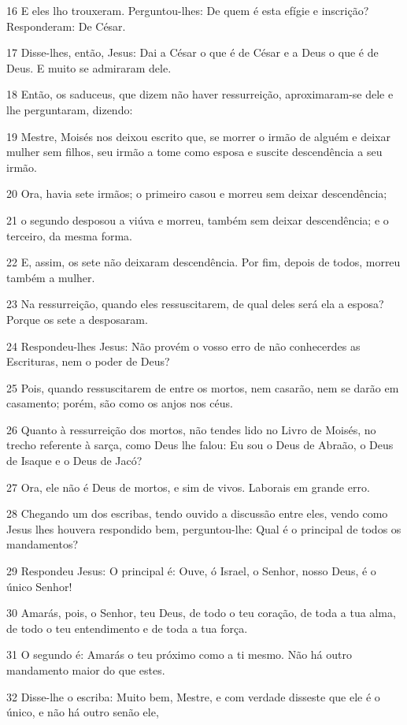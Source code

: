 \par 16 E eles lho trouxeram. Perguntou-lhes: De quem é esta efígie e inscrição? Responderam: De César.
\par 17 Disse-lhes, então, Jesus: Dai a César o que é de César e a Deus o que é de Deus. E muito se admiraram dele.
\par 18 Então, os saduceus, que dizem não haver ressurreição, aproximaram-se dele e lhe perguntaram, dizendo:
\par 19 Mestre, Moisés nos deixou escrito que, se morrer o irmão de alguém e deixar mulher sem filhos, seu irmão a tome como esposa e suscite descendência a seu irmão.
\par 20 Ora, havia sete irmãos; o primeiro casou e morreu sem deixar descendência;
\par 21 o segundo desposou a viúva e morreu, também sem deixar descendência; e o terceiro, da mesma forma.
\par 22 E, assim, os sete não deixaram descendência. Por fim, depois de todos, morreu também a mulher.
\par 23 Na ressurreição, quando eles ressuscitarem, de qual deles será ela a esposa? Porque os sete a desposaram.
\par 24 Respondeu-lhes Jesus: Não provém o vosso erro de não conhecerdes as Escrituras, nem o poder de Deus?
\par 25 Pois, quando ressuscitarem de entre os mortos, nem casarão, nem se darão em casamento; porém, são como os anjos nos céus.
\par 26 Quanto à ressurreição dos mortos, não tendes lido no Livro de Moisés, no trecho referente à sarça, como Deus lhe falou: Eu sou o Deus de Abraão, o Deus de Isaque e o Deus de Jacó?
\par 27 Ora, ele não é Deus de mortos, e sim de vivos. Laborais em grande erro.
\par 28 Chegando um dos escribas, tendo ouvido a discussão entre eles, vendo como Jesus lhes houvera respondido bem, perguntou-lhe: Qual é o principal de todos os mandamentos?
\par 29 Respondeu Jesus: O principal é: Ouve, ó Israel, o Senhor, nosso Deus, é o único Senhor!
\par 30 Amarás, pois, o Senhor, teu Deus, de todo o teu coração, de toda a tua alma, de todo o teu entendimento e de toda a tua força.
\par 31 O segundo é: Amarás o teu próximo como a ti mesmo. Não há outro mandamento maior do que estes.
\par 32 Disse-lhe o escriba: Muito bem, Mestre, e com verdade disseste que ele é o único, e não há outro senão ele,

